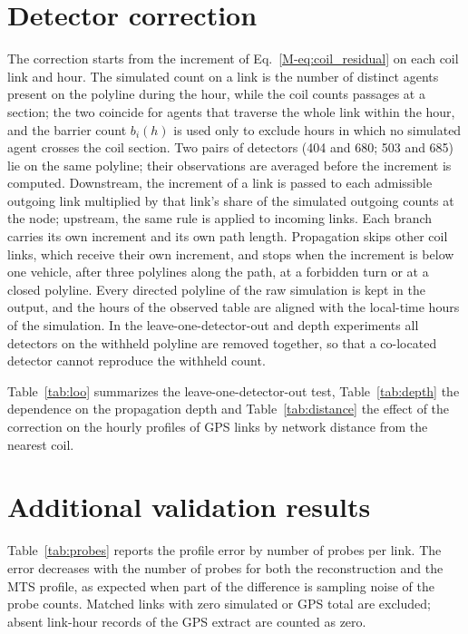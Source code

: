 \documentclass[11pt,a4paper]{article}
\begin{document}




\section{Detector correction}
\label{sec:correction}

The correction starts from the increment of Eq.~\eqref{M-eq:coil_residual} on each coil link and hour. The simulated count on a link is the number of distinct agents present on the polyline during the hour, while the coil counts passages at a section; the two coincide for agents that traverse the whole link within the hour, and the barrier count $b_i(h)$ is used only to exclude hours in which no simulated agent crosses the coil section. Two pairs of detectors (404 and 680; 503 and 685) lie on the same polyline; their observations are averaged before the increment is computed. Downstream, the increment of a link is passed to each admissible outgoing link multiplied by that link's share of the simulated outgoing counts at the node; upstream, the same rule is applied to incoming links. Each branch carries its own increment and its own path length. Propagation skips other coil links, which receive their own increment, and stops when the increment is below one vehicle, after three polylines along the path, at a forbidden turn or at a closed polyline. Every directed polyline of the raw simulation is kept in the output, and the hours of the observed table are aligned with the local-time hours of the simulation. In the leave-one-detector-out and depth experiments all detectors on the withheld polyline are removed together, so that a co-located detector cannot reproduce the withheld count.

Table~\ref{tab:loo} summarizes the leave-one-detector-out test, Table~\ref{tab:depth} the dependence on the propagation depth and Table~\ref{tab:distance} the effect of the correction on the hourly profiles of GPS links by network distance from the nearest coil.





\section{Additional validation results}
\label{sec:validation}

Table~\ref{tab:probes} reports the profile error by number of probes per link. The error decreases with the number of probes for both the reconstruction and the MTS profile, as expected when part of the difference is sampling noise of the probe counts. Matched links with zero simulated or GPS total are excluded; absent link-hour records of the GPS extract are counted as zero.
\end{document}
